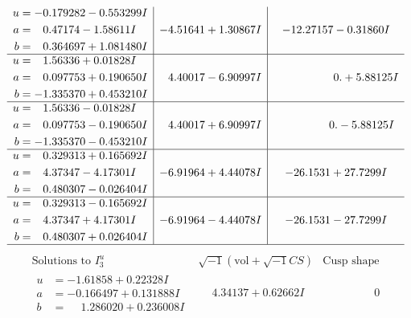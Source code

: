 \documentclass[1p]{elsarticle_modified}
\theoremstyle{definition}
\newcommand{\I}{\sqrt{-1}}
\begin{document}
$$\begin{array}{c|c|c}
\begin{aligned}
u &= -0.179282 - 0.553299 I \\
a &= \phantom{-}0.47174 - 1.58611 I \\
b &= \phantom{-}0.364697 + 1.081480 I\end{aligned}
 & -4.51641 + 1.30867 I & -12.27157 - 0.31860 I \\ \hline\begin{aligned}
u &= \phantom{-}1.56336 + 0.01828 I \\
a &= \phantom{-}0.097753 + 0.190650 I \\
b &= -1.335370 + 0.453210 I\end{aligned}
 & \phantom{-}4.40017 - 6.90997 I & \phantom{-0.000000 -}0. + 5.88125 I \\ \hline\begin{aligned}
u &= \phantom{-}1.56336 - 0.01828 I \\
a &= \phantom{-}0.097753 - 0.190650 I \\
b &= -1.335370 - 0.453210 I\end{aligned}
 & \phantom{-}4.40017 + 6.90997 I & \phantom{-0.000000 } 0. - 5.88125 I \\ \hline\begin{aligned}
u &= \phantom{-}0.329313 + 0.165692 I \\
a &= \phantom{-}4.37347 - 4.17301 I \\
b &= \phantom{-}0.480307 - 0.026404 I\end{aligned}
 & -6.91964 + 4.44078 I & -26.1531 + 27.7299 I \\ \hline\begin{aligned}
u &= \phantom{-}0.329313 - 0.165692 I \\
a &= \phantom{-}4.37347 + 4.17301 I \\
b &= \phantom{-}0.480307 + 0.026404 I\end{aligned}
 & -6.91964 - 4.44078 I & -26.1531 - 27.7299 I\\
 \hline 
 \end{array}$$\newpage$$\begin{array}{c|c|c}  
\text{Solutions to }I^u_{3}& \I (\text{vol} + \sqrt{-1}CS) & \text{Cusp shape}\\
 \hline 
\begin{aligned}
u &= -1.61858 + 0.22328 I \\
a &= -0.166497 + 0.131888 I \\
b &= \phantom{-}1.286020 + 0.236008 I\end{aligned}
 & \phantom{-}4.34137 + 0.62662 I & \phantom{-0.000000 } 0 \\ \hline\begin{aligned}

\end{aligned}
\end{array}$$
\end{document}

